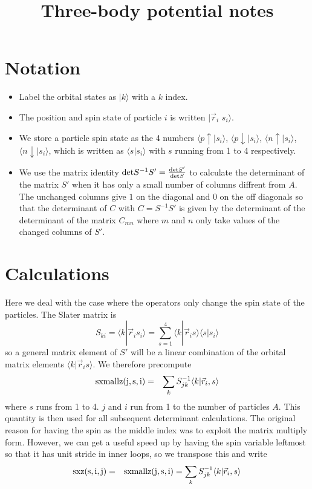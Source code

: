 \documentclass[12pt]{article}
\begin{document}
\title{Three-body potential notes}
\maketitle
\section{Notation}
\begin{itemize}
\item
Label the orbital states as $|k\rangle$ with a $k$ index.
\item
The position and spin state
of particle $i$ is written $|\vec r_i$ $s_i\rangle$.
\item
We store a particle
spin state as the 4 numbers
$\langle p\uparrow|s_i\rangle$,
$\langle p\downarrow|s_i\rangle$,
$\langle n\uparrow|s_i\rangle$,
$\langle n\downarrow|s_i\rangle$, which is written as
$\langle s|s_i\rangle$ with $s$ running from 1 to 4 respectively.
\item
We use the matrix identity 
${\rm det} S^{-1}S' = \frac{{\rm det} S'}{{\rm det}S}$ to calculate
the determinant of the matrix $S'$ when it has only a small number
of columns diffrent from $A$. The unchanged columns give $1$ on the
diagonal and $0$ on the off diagonals so that the determinant of $C$
with $C=S^{-1}S'$ is given by the determinant of the determinant
of the matrix $C_{mn}$ where $m$ and $n$ only take values of the changed
columns of $S'$.
\end{itemize}

\section{Calculations}
Here we deal with the case where the operators only change the spin state
of the particles. The Slater matrix is
\begin{equation}
S_{ki} = \langle k|\vec r_i s_i\rangle =
\sum_{s=1}^4\langle k|\vec r_i s\rangle \langle s|s_i\rangle
\end{equation}
so a general matrix element of $S'$ will be a linear combination of
the orbital matrix elements
$\langle k|\vec r_i s\rangle$. We therefore precompute
\begin{eqnarray}
{\rm sxmallz(j,s,i)} &=& \sum_k S^{-1}_{jk} \langle k|\vec r_i, s\rangle
\end{eqnarray}
where $s$ runs from 1 to 4. $j$ and $i$ run from 1 to the number of
particles $A$. This quantity is then used for all subsequent determinant
calculations. The original reason for having the spin as the middle index
was to exploit the matrix multiply form.
However, we can get a useful speed up by having the spin
variable leftmost so that it has unit stride in inner loops, so
we transpose this and write
\begin{eqnarray}
{\rm sxz(s,i,j)} &=&
{\rm sxmallz(j,s,i)} = \sum_k S^{-1}_{jk} \langle k|\vec r_i, s\rangle
\end{eqnarray}
\end{document}
